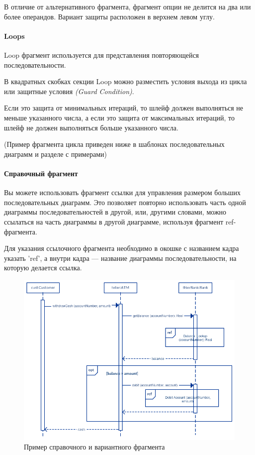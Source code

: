 \documentclass[a4paper,12pt]{report}
\begin{document}
В отличие от альтернативного фрагмента, фрагмент опции не делится на два или более операндов. Вариант защиты расположен в верхнем левом углу.

\paragraph{Loops}

Loop фрагмент используется для представления повторяющейся последовательности.

В квадратных скобках секции Loop можно разместить условия выхода из цикла или защитные условия \textit{(Guard Condition)}. 

Если это защита от минимальных итераций, то шлейф должен выполняться не меньше указанного числа, а если это защита от максимальных итераций, то шлейф не должен выполняться больше указанного числа.

(Пример фрагмента цикла приведен ниже в шаблонах последовательных диаграмм и разделе с примерами)

\paragraph{Справочный фрагмент}

Вы можете использовать фрагмент ссылки для управления размером больших последовательных диаграмм. Это позволяет повторно использовать часть одной диаграммы последовательностей в другой, или, другими словами, можно ссылаться на часть диаграммы в другой диаграмме, используя фрагмент ref-фрагмента.

Для указания ссылочного фрагмента необходимо в окошке с названием кадра указать 'ref', а внутри кадра --- название диаграммы последовательности, на которую делается ссылка.

\begin{figure}[h!]
	\centering
	\includegraphics[width=0.5\linewidth]{images/frameoptref}
	\caption{Пример справочного и вариантного фрагмента}
	\label{fig:frameoptref}
\end{figure}
\end{document}
